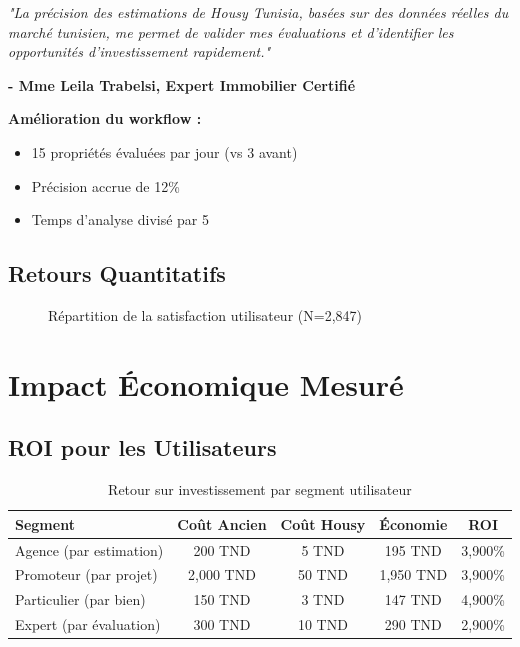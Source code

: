 \begin{tcolorbox}[colback=green!5!white,colframe=green!75!black,title=Témoignage - Expert Évaluateur Indépendant]
\textit{"La précision des estimations de Housy Tunisia, basées sur des données réelles du marché tunisien, me permet de valider mes évaluations et d'identifier les opportunités d'investissement rapidement."}

\textbf{- Mme Leila Trabelsi, Expert Immobilier Certifié}

\textbf{Amélioration du workflow :}
\begin{itemize}
    \item 15 propriétés évaluées par jour (vs 3 avant)
    \item Précision accrue de 12\%
    \item Temps d'analyse divisé par 5
\end{itemize}
\end{tcolorbox}

\subsection{Retours Quantitatifs}

\begin{figure}[H]
\centering
{}
\caption{Répartition de la satisfaction utilisateur (N=2,847)}
\end{figure}

\section{Impact Économique Mesuré}

\subsection{ROI pour les Utilisateurs}

\begin{table}[H]
\centering
\caption{Retour sur investissement par segment utilisateur}
\begin{tabular}{|l|c|c|c|c|}
\hline
\textbf{Segment} & \textbf{Coût Ancien} & \textbf{Coût Housy} & \textbf{Économie} & \textbf{ROI} \\
\hline
Agence (par estimation) & 200 TND & 5 TND & 195 TND & 3,900\% \\
\hline
Promoteur (par projet) & 2,000 TND & 50 TND & 1,950 TND & 3,900\% \\
\hline
Particulier (par bien) & 150 TND & 3 TND & 147 TND & 4,900\% \\
\hline
Expert (par évaluation) & 300 TND & 10 TND & 290 TND & 2,900\% \\
\hline
\end{tabular}
\end{table}

